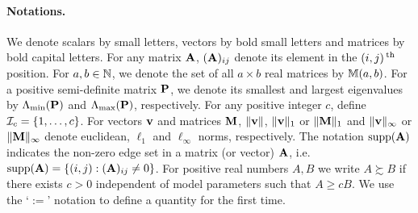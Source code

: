 \paragraph{Notations.}
We denote scalars by small letters, vectors by bold small letters and matrices by bold capital letters. For any matrix ${\mathbf{A}}$, $({\mathbf{A}})_{ij}$ denote its element in the $(i,j)\operatorname*{^{\text{th}}}$ position. For $a,b \in {\mathbb{N}}$, we denote the set of all $a \times b$ real matrices by ${\mathbb{M}}(a,b)$. For a positive semi-definite matrix ${\mathbf{P}}$, we denote its smallest and largest eigenvalues by $\Lambda_{\min} ({\mathbf{P}})$ and $\Lambda_{\max} ({\mathbf{P}})$, respectively. For any positive integer $c$, define ${\cal{I}}_c = \{ 1, \ldots, c\}$. For vectors ${\bf{v}}$ and matrices ${\mathbf{M}}$, $\| {\bf{v}} \|$, $\|{\bf{v}} \|_1$ or $\|{\mathbf{M}} \|_1$ and $\|{\bf{v}} \|_\infty$ or $\|{\mathbf{M}} \|_\infty$ denote euclidean, $\ell_1$ and $\ell_\infty$ norms, respectively. The notation $\operatorname*{supp}({\mathbf{A}})$ indicates the non-zero edge set in a matrix (or vector) ${\mathbf{A}}$, i.e. $\operatorname*{supp}({\mathbf{A}}) = \{(i,j): ({\mathbf{A}})_{ij} \neq 0\}$. For positive real numbers $A, B$ we write $A \succsim B$ if there exists $c>0$ independent of model parameters such that $A \geq cB$. We use the `$:=$' notation to define a quantity for the first time.